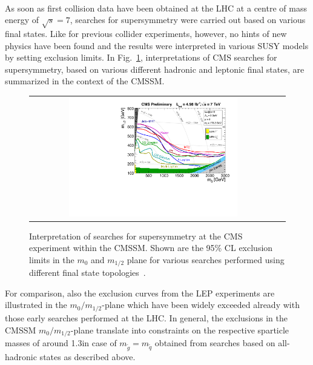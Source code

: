 \\
As soon as first collision data have been obtained at the LHC at a centre of mass energy of $\sqrt{s} = 7$\tev, searches for supersymmetry were carried out based on various final states. Like for previous collider experiments, however, no hints of new physics have been found and the results were interpreted in various SUSY models by setting exclusion limits. In Fig.~\ref{fig:CMSSM_7TeV}, interpretations of CMS searches for supersymmetry, based on various different hadronic and leptonic final states, are summarized in the context of the CMSSM. 
\begin{figure}[!tp]
  \centering 
  \begin{tabular}{cc}
    \includegraphics[width=0.7\textwidth]{figures/CMS_SUSY_2011Limits5fb_tanb10.pdf} 
  \end{tabular}
  \caption{Interpretation of searches for supersymmetry at the CMS experiment within the CMSSM. Shown are the 95\% CL exclusion limits in the $m_0$ and $m_{1/2}$ plane for various searches performed using different final state topologies~\cite{bib:CMS:PhysicsResultsSUS}.}
  \label{fig:CMSSM_7TeV}
\end{figure}
For comparison, also the exclusion curves from the LEP experiments are illustrated in the $m_0/m_{1/2}$-plane which have been widely exceeded already with those early searches performed at the LHC. In general, the exclusions in the CMSSM $m_0/m_{1/2}$-plane translate into constraints on the respective sparticle masses of around 1.3\tev in case of $m_{\tilde{g}} = m_{\tilde{q}}$ obtained from searches based on all-hadronic states as described above.  \\
